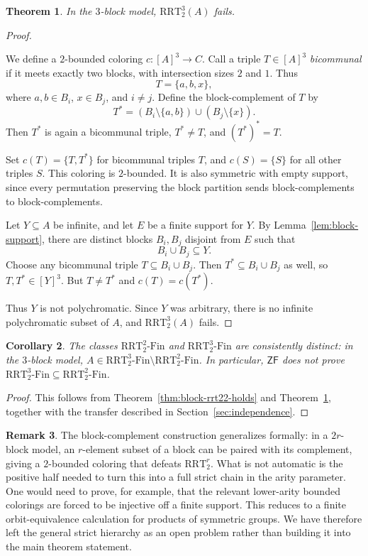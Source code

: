 \documentclass[11pt]{amsart}
\newtheorem{theorem}{Theorem}[section]
\newtheorem{corollary}[theorem]{Corollary}
\theoremstyle{definition}
\newtheorem{remark}[theorem]{Remark}
\newcommand{\ZF}{\mathsf{ZF}}
\newcommand{\RRT}{\mathrm{RRT}}
\newcommand{\RRTFin}[2]{\RRT^{#1}_{#2}\text{-}\mathrm{Fin}}
\begin{document}
\begin{theorem}\label{thm:block-rrt32-fails}
In the \(3\)-block model, \(\RRT^3_2(A)\) fails.
\end{theorem}

\begin{proof}
\begin{samepage}
We define a \(2\)-bounded coloring \(c:[A]^3\to C\).  Call a triple \(T\in[A]^3\) \emph{bicommunal} if it meets exactly two blocks, with intersection sizes \(2\) and \(1\).  Thus
\[
    T=\{a,b,x\},
\]
where \(a,b\in B_i\), \(x\in B_j\), and \(i\neq j\).  Define the block-complement of \(T\) by
\[
    T^*=(B_i\setminus\{a,b\})\cup (B_j\setminus\{x\}).
\]
Then \(T^*\) is again a bicommunal triple, \(T^*\neq T\), and \((T^*)^*=T\).
\end{samepage}

Set \(c(T)=\{T,T^*\}\) for bicommunal triples \(T\), and \(c(S)=\{S\}\) for all other triples \(S\).  This coloring is \(2\)-bounded.  It is also symmetric with empty support, since every permutation preserving the block partition sends block-complements to block-complements.

Let \(Y\subseteq A\) be infinite, and let \(E\) be a finite support for \(Y\).  By Lemma~\ref{lem:block-support}, there are distinct blocks \(B_i,B_j\) disjoint from \(E\) such that
\[
    B_i\cup B_j\subseteq Y.
\]
Choose any bicommunal triple \(T\subseteq B_i\cup B_j\).  Then \(T^*\subseteq B_i\cup B_j\) as well, so \(T,T^*\in[Y]^3\).  But \(T\neq T^*\) and \(c(T)=c(T^*)\).

Thus \(Y\) is not polychromatic.  Since \(Y\) was arbitrary, there is no infinite polychromatic subset of \(A\), and \(\RRT^3_2(A)\) fails.
\end{proof}

\begin{corollary}
The classes \(\RRTFin{2}{2}\) and \(\RRTFin{3}{2}\) are consistently distinct: in the \(3\)-block model, \(A\in \RRTFin{3}{2}\setminus \RRTFin{2}{2}\).  In particular, \(\ZF\) does not prove \(\RRTFin{3}{2}\subseteq \RRTFin{2}{2}\).
\end{corollary}

\begin{proof}
This follows from Theorem~\ref{thm:block-rrt22-holds} and Theorem~\ref{thm:block-rrt32-fails}, together with the transfer described in Section~\ref{sec:independence}.
\end{proof}

\begin{remark}
The block-complement construction generalizes formally: in a \(2r\)-block model, an \(r\)-element subset of a block can be paired with its complement, giving a \(2\)-bounded coloring that defeats \(\RRT^r_2\).  What is not automatic is the positive half needed to turn this into a full strict chain in the arity parameter.  One would need to prove, for example, that the relevant lower-arity bounded colorings are forced to be injective off a finite support.  This reduces to a finite orbit-equivalence calculation for products of symmetric groups.  We have therefore left the general strict hierarchy as an open problem rather than building it into the main theorem statement.
\end{remark}
\end{document}
